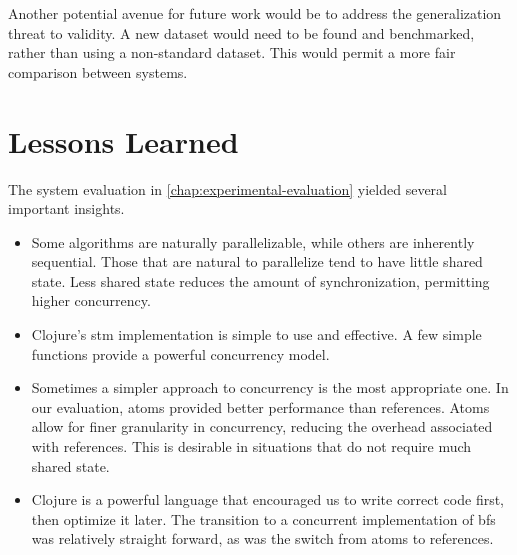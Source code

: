 		Another potential avenue for future work would be to address the generalization threat to validity.  A new dataset would need to be found and benchmarked, rather than using a non-standard dataset.  This would permit a more fair comparison between systems.
		
	\section{Lessons Learned}
		The system evaluation in \cref{chap:experimental-evaluation} yielded several important insights.
		
		\begin{itemize}
			\item Some algorithms are naturally parallelizable, while others are inherently sequential.  Those that are natural to parallelize tend to have little shared state.  Less shared state reduces the amount of synchronization, permitting higher concurrency.
			\item Clojure's \gls{stm} implementation is simple to use and effective.  A few simple functions provide a powerful concurrency model.
			\item Sometimes a simpler approach to concurrency is the most appropriate one.  In our evaluation, atoms provided better performance than references.  Atoms allow for finer granularity in concurrency, reducing the overhead associated with references.  This is desirable in situations that do not require much shared state.
			\item Clojure is a powerful language that encouraged us to write correct code first, then optimize it later.  The transition to a concurrent implementation of \gls{bfs} was relatively straight forward, as was the switch from atoms to references.
		\end{itemize}
